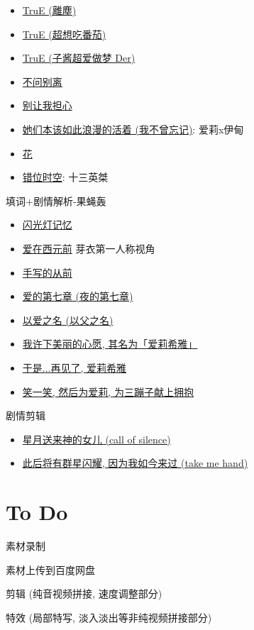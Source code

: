\documentclass[a4paper]{article}
\begin{document}
\begin{itemize}
    \item \href{https://www.bilibili.com/video/BV1gB4y1V7XK/}{TruE (離塵)}
    \item \href{https://www.bilibili.com/video/BV1SF411w73C/}{TruE (超想吃番茄)}
    \item \href{https://www.bilibili.com/video/BV1MB4y1V71h/}{TruE (子酱超爱做梦 Der)}
    \item \href{https://www.bilibili.com/video/BV19a4y1S7wF/}{不问别离}
    \item \href{https://www.bilibili.com/video/BV1vC4y177zp/}{别让我担心}
    \item \href{https://www.bilibili.com/video/BV1pu411a7cv/}{她们本该如此浪漫的活着 (我不曾忘记)}: 爱莉x伊甸
    \item \href{https://www.bilibili.com/video/BV1DT41167gi/}{花}
    \item \href{https://www.bilibili.com/video/BV1Le4y1R73E/}{错位时空}: 十三英桀
\end{itemize}

填词+剧情解析-果蝇轰

\begin{itemize}
    \item \href{https://www.bilibili.com/video/BV1HppJeuEis/}{闪光灯记忆}
    \item \href{https://www.bilibili.com/video/BV1 qN411g71m/}{爱在西元前} 芽衣第一人称视角
    \item \href{https://www.bilibili.com/video/BV1PV4y1x7CD/}{手写的从前}
    \item \href{https://www.bilibili.com/video/BV1dr4y177gy/}{爱的第七章 (夜的第七章)}
    \item \href{https://www.bilibili.com/video/BV1Yr4y1q7Pt/}{以爱之名 (以父之名)}
    \item \href{https://www.bilibili.com/video/BV1BF411w7fD/}{我许下美丽的心愿, 其名为「爱莉希雅」}
    \item \href{https://www.bilibili.com/video/BV1Cr4y1573W/}{于是...再见了, 爱莉希雅}
    \item \href{https://www.bilibili.com/video/BV1WN4y1L745/}{笑一笑, 然后为爱莉, 为三蹦子献上拥抱}
\end{itemize}

剧情剪辑

\begin{itemize}
    \item \href{https://www.bilibili.com/video/BV1ZT4y1s7Zd/}{星月送来神的女儿 (call of silence)}
    \item \href{https://www.bilibili.com/video/BV1Sm41167aK/}{此后将有群星闪耀, 因为我如今来过 (take me hand)}
\end{itemize}

\section{To Do}

素材录制

素材上传到百度网盘

剪辑 (纯音视频拼接, 速度调整部分)

特效 (局部特写, 淡入淡出等非纯视频拼接部分)
\end{document}
